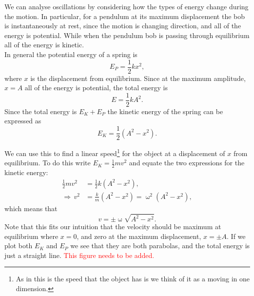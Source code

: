 We can analyse oscillations by considering how the types of energy change during the motion. In particular, for a pendulum at its maximum displacement the bob is instantaneously at rest, since the motion is changing direction, and all of the energy is potential. While when the pendulum bob is passing through equilibrium all of the energy is kinetic.\\

In general the potential energy of a spring is
\begin{equation*}
E_{P}=\frac{1}{2}kx^{2},
\end{equation*} 
where $x$ is the displacement from equilibrium. Since at the maximum amplitude, $x=A$ all of the energy is potential, the total energy is
\begin{equation*}
E=\frac{1}{2}kA^{2}.
\end{equation*}
Since the total energy is $E_{K}+E_{P}$ the kinetic energy of the spring can be expressed as
\begin{equation*}
E_{K}=\frac{1}{2}\left(A^{2}-x^{2}\right).
\end{equation*}

We can use this to find a linear speed\footnote{As in this is the speed that the object has is we think of it as a moving in one dimension.} for the object at a displacement of $x$ from equilibrium. To do this write $E_{K}=\frac{1}{2}mv^{2}$ and equate the two expressions for the kinetic energy:
\begin{align*}
\frac{1}{2}mv^{2}&=\frac{1}{2}k\left(A^{2}-x^{2}\right),\\
\Rightarrow \, v^{2}&=\frac{k}{m}\left(A^{2}-x^{2}\right)=\upomega^{2}\left(A^{2}-x^{2}\right),
\end{align*}
which means that
\begin{equation*}
v=\pm\upomega\sqrt{A^{2}-x^{2}}.
\end{equation*}
Note that this fits our intuition that the velocity should be maximum at equilibrium where $x=0$, and zero at the maximum displacement, $x=\pm A$. If we plot both $E_{K}$ and $E_{P}$ we see that they are both parabolas, and the total energy is just a straight line. \textcolor{red}{This figure needs to be added.}

